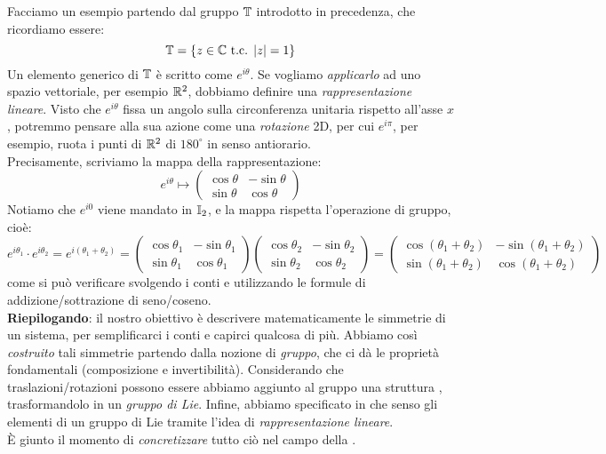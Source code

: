 \documentclass[../../FisicaTeorica.tex]{subfiles}
\begin{document}
Facciamo un esempio partendo dal gruppo $\mathbb{T}$ introdotto in precedenza, che ricordiamo essere:
\[
\mathbb{T} =\{z \in \mathbb{C} \text{ t.c. } |z|=1\}
\]
Un elemento generico di $\mathbb{T}$ è scritto come $e^{i\theta}$. Se vogliamo \textit{applicarlo} ad uno spazio vettoriale, per esempio $\mathbb{R}^2$, dobbiamo definire una \textit{rappresentazione lineare}. Visto che $e^{i\theta}$ fissa un angolo sulla circonferenza unitaria rispetto all'asse $x$, potremmo pensare alla sua azione come una \textit{rotazione} 2D, per cui $e^{i\pi}$, per esempio, ruota i punti di $\mathbb{R}^2$ di $180^\circ$ in senso antiorario.\\
Precisamente, scriviamo la mappa della rappresentazione:
\[
e^{i\theta} \mapsto \begin{pmatrix}
\cos\theta & -\sin\theta\\
\sin\theta & \cos\theta
\end{pmatrix}
\]
Notiamo che $e^{i0}$ viene mandato in $\mathbb{I}_2$, e la mappa rispetta l'operazione di gruppo, cioè:
\[
e^{i\theta_1} \cdot e^{i\theta_2} = e^{i(\theta_1 +\theta_2)} = \begin{pmatrix}
\cos\theta_1 & -\sin\theta_1\\
\sin\theta_1 & \cos\theta_1
\end{pmatrix}
\begin{pmatrix}
\cos\theta_2 & -\sin\theta_2\\
\sin\theta_2 & \cos\theta_2
\end{pmatrix}
=
\begin{pmatrix}
\cos(\theta_1+\theta_2) & -\sin(\theta_1+\theta_2)\\
\sin(\theta_1+\theta_2) & \cos(\theta_1+\theta_2)
\end{pmatrix}
\]
come si può verificare svolgendo i conti e utilizzando le formule di addizione/sottrazione di seno/coseno.\\

\textbf{Riepilogando}: il nostro obiettivo è descrivere matematicamente le simmetrie di un sistema, per semplificarci i conti e capirci qualcosa di più. Abbiamo così \textit{costruito} tali simmetrie partendo dalla nozione di \textit{gruppo}, che ci dà le proprietà fondamentali (composizione e invertibilità). Considerando che traslazioni/rotazioni possono essere  abbiamo aggiunto al gruppo una struttura , trasformandolo in un \textit{gruppo di Lie}. Infine, abbiamo specificato in che senso gli elementi di un gruppo di Lie  tramite l'idea di \textit{rappresentazione lineare}.\\
È giunto il momento di \textit{concretizzare} tutto ciò nel campo della \MQ.\\
\end{document}
